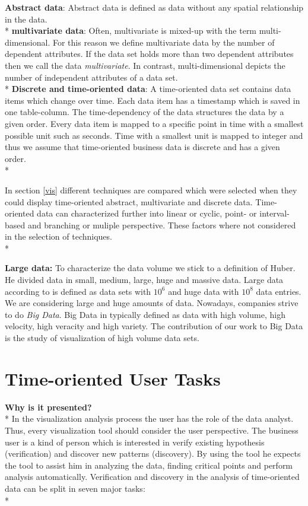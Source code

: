 \textbf{Abstract data}: Abstract data is defined as data without any spatial relationship in the data\cite{Shneiderman1996}. \\*
\textbf{multivariate data}: 
Often, multivariate is mixed-up with the term multi-dimensional. For this reason we define  multivariate data by the number of dependent attributes. If the data set holds more than two dependent attributes then we call the data \textit{multivariate}. In contrast, multi-dimensional depicts the number of independent attributes of a data set\cite{Aigner2011}.  \\*
\textbf{Discrete and time-oriented data}: A time-oriented data set contains data items which change over time. Each data item has a timestamp which is saved in one table-column. The time-dependency of the data structures the data by a given order. Every data item is mapped to a specific point in time with a smallest possible unit such as seconds. Time with a smallest unit is mapped to integer\cite{Aigner2011} and thus we assume that time-oriented business data is discrete and has a given order.  \\*

In section \ref{vis} different techniques are compared which were selected when they could display time-oriented abstract, multivariate and discrete data. 
Time-oriented data can characterized further into linear or cyclic, point- or interval-based and branching or muliple perspective\cite{Aigner2011}. These factors where not considered in the selection of techniques. \\*

\textbf{Large data:} To characterize the data volume we stick to a definition of Huber. He divided data in small, medium, large, huge and massive data. Large data according to\cite{Huber1994} is defined as data sets with $10^6$ and huge data with $10^8$ data entries. We are considering large and huge amounts of data. Nowadays, companies strive to do \textit{Big Data}. Big Data in typically defined as data with  high volume, high velocity, high veracity and high variety\cite{Wang2015}. The contribution of our work to Big Data is the study of visualization of high volume data sets.



\section{Time-oriented User Tasks} \label{tasks}
\textbf{Why is it presented?}\\*
In the visualization analysis process the user has the role of the data analyst. Thus, every visualization tool should consider the user perspective. The business user is a kind of person which is interested in verify existing hypothesis (verification) and discover new patterns (discovery). By using the tool he expects the tool to assist him in analyzing the data, finding critical points and perform analysis automatically\cite{Brachman1996}. Verification and discovery in the analysis of time-oriented data can be split in seven major tasks\cite{Esling2012}:\\*

